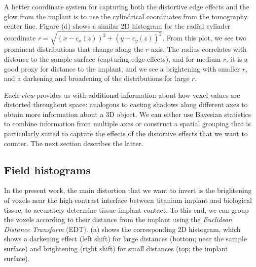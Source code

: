 A better coordinate system for capturing both the distortive edge effects and
the glow from the implant is to use the cylindrical coordinates from the
tomography center line. Figure (d) shows a similar 2D
histogram for the radial cylinder coordinate $r=\sqrt{\left(
x-c_x(z)\right)^2+\left( y-c_y(z)\right)^2}$. From this plot, we see two
prominent distributions that change along the $r$ axis. The radius correlates
with distance to the sample surface (capturing edge effects), and for medium
$r$, it is a good proxy for distance to the implant, and we see a brightening
with smaller $r$, and a darkening and broadening of the distributions for large
$r$.

Each \textit{view} provides us with additional information about how voxel
values are distorted throughout space: analogous to casting shadows along
different axes to obtain more information about a 3D object. We can either use
Bayesian statistics to combine information from multiple axes or construct a
spatial grouping that is particularly suited to capture the effects of the
distortive effects that we want to counter. The next section describes the
latter.

\subsection{Field histograms}

In the present work, the main distortion that we want to invert is the
brightening of voxels near the high-contrast interface between titanium implant
and biological tissue, to accurately determine tissue-implant contact. To this
end, we can group the voxels according to their distance from the implant using
the \textit{Euclidean Distance Transform} (EDT). (a) shows
the corresponding 2D histogram, which shows a darkening effect (left shift) for
large distances (bottom; near the sample surface) and brightening (right shift)
for small distances (top; the implant surface).

